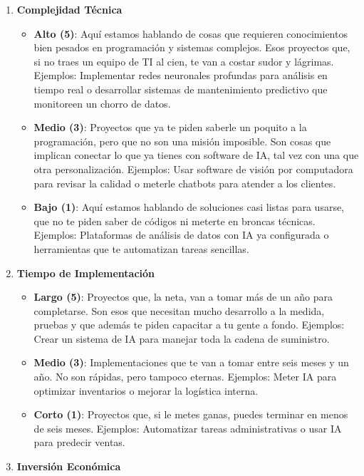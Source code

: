 \documentclass[
  letterpaper,
]{book}
\providecommand{\tightlist}{%
  \setlength{\itemsep}{0pt}\setlength{\parskip}{0pt}}\usepackage{longtable,booktabs,array}
\begin{document}
\begin{enumerate}
\def\labelenumi{\arabic{enumi}.}
\tightlist
\item
  \textbf{Complejidad Técnica}

  \begin{itemize}
  \tightlist
  \item
    \textbf{Alto (5)}: Aquí estamos hablando de cosas que requieren
    conocimientos bien pesados en programación y sistemas complejos.
    Esos proyectos que, si no traes un equipo de TI al cien, te van a
    costar sudor y lágrimas. Ejemplos: Implementar redes neuronales
    profundas para análisis en tiempo real o desarrollar sistemas de
    mantenimiento predictivo que monitoreen un chorro de datos.
  \item
    \textbf{Medio (3)}: Proyectos que ya te piden saberle un poquito a
    la programación, pero que no son una misión imposible. Son cosas que
    implican conectar lo que ya tienes con software de IA, tal vez con
    una que otra personalización. Ejemplos: Usar software de visión por
    computadora para revisar la calidad o meterle chatbots para atender
    a los clientes.
  \item
    \textbf{Bajo (1)}: Aquí estamos hablando de soluciones casi listas
    para usarse, que no te piden saber de códigos ni meterte en broncas
    técnicas. Ejemplos: Plataformas de análisis de datos con IA ya
    configurada o herramientas que te automatizan tareas sencillas.
  \end{itemize}
\item
  \textbf{Tiempo de Implementación}

  \begin{itemize}
  \tightlist
  \item
    \textbf{Largo (5)}: Proyectos que, la neta, van a tomar más de un
    año para completarse. Son esos que necesitan mucho desarrollo a la
    medida, pruebas y que además te piden capacitar a tu gente a fondo.
    Ejemplos: Crear un sistema de IA para manejar toda la cadena de
    suministro.
  \item
    \textbf{Medio (3)}: Implementaciones que te van a tomar entre seis
    meses y un año. No son rápidas, pero tampoco eternas. Ejemplos:
    Meter IA para optimizar inventarios o mejorar la logística interna.
  \item
    \textbf{Corto (1)}: Proyectos que, si le metes ganas, puedes
    terminar en menos de seis meses. Ejemplos: Automatizar tareas
    administrativas o usar IA para predecir ventas.
  \end{itemize}
\item
  \textbf{Inversión Económica}


\end{enumerate}
\end{document}
